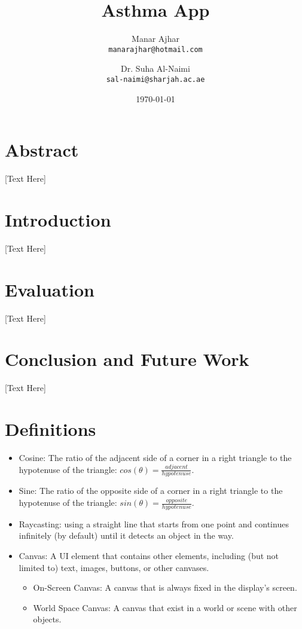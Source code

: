 \documentclass[a4paper, 12pt]{article}
\title{Asthma App}
\author{Manar Ajhar \\ \texttt{manarajhar@hotmail.com} \and Dr. Suha Al-Naimi \\ \texttt{sal-naimi@sharjah.ac.ae}}
\date{\today}
\begin{document}
\maketitle

\section*{Abstract}
[Text Here]

\section{Introduction}
[Text Here]


\section{Evaluation}
[Text Here]
\section{Conclusion and Future Work}
[Text Here]

\section{Definitions}
\begin{itemize}
    \item{Cosine: The ratio of the adjacent side of a corner in a right triangle to the hypotenuse of the triangle: $cos(\theta) = \frac{adjacent}{hypotenuse}$.}

    \item{Sine: The ratio of the opposite side of a corner in a right triangle to the hypotenuse of the triangle: $sin(\theta) = \frac{opposite}{hypotenuse}$.}
    
    \item{Raycasting: using a straight line that starts from one point and continues infinitely (by default) until it detects an object in the way.}
    
    \item{Canvas: A UI element that contains other elements, including (but not limited to) text, images, buttons, or other canvases.}

\begin{itemize}
    \item{On-Screen Canvas: A canvas that is always fixed in the display’s screen.}
    
    \item{World Space Canvas: A canvas that exist in a world or scene with other objects.}
\end{itemize}

\end{itemize}
\end{document}
